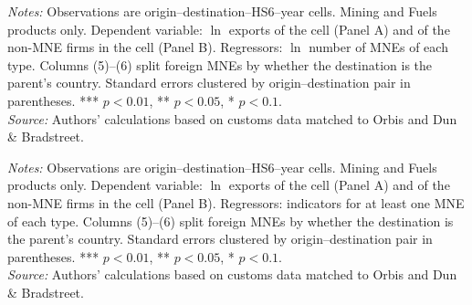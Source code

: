 \documentclass[11pt,a4paper]{article}
\begin{document}
\begin{table}[H]\centering\small%
  \caption{Mining and Fuels: Multinational Presence and Exports: Intensive Margin, by Type of Multinational}%
  \label{tab:cnt_mining}%
  \par\vspace{3pt}%
  \begin{minipage}{0.95\textwidth}\footnotesize %
  \textit{Notes:} Observations are origin--destination--HS6--year cells. Mining and Fuels products only. Dependent variable: $\ln$ exports of the cell (Panel A) and of the non-MNE firms in the cell (Panel B). Regressors: $\ln$ number of MNEs of each type. Columns (5)--(6) split foreign MNEs by whether the destination is the parent's country. Standard errors clustered by origin--destination pair in parentheses. *** $p<0.01$, ** $p<0.05$, * $p<0.1$.\\[3pt]%
  \textit{Source:} Authors' calculations based on customs data matched to Orbis and Dun \& Bradstreet.%
  \end{minipage}%
  \end{table}
\begin{table}[H]\centering\small%
  \caption{Mining and Fuels: Multinational Presence and Exports: Extensive Margin, by Type of Multinational}%
  \label{tab:ext_mining}%
  \par\vspace{3pt}%
  \begin{minipage}{0.95\textwidth}\footnotesize %
  \textit{Notes:} Observations are origin--destination--HS6--year cells. Mining and Fuels products only. Dependent variable: $\ln$ exports of the cell (Panel A) and of the non-MNE firms in the cell (Panel B). Regressors: indicators for at least one MNE of each type. Columns (5)--(6) split foreign MNEs by whether the destination is the parent's country. Standard errors clustered by origin--destination pair in parentheses. *** $p<0.01$, ** $p<0.05$, * $p<0.1$.\\[3pt]%
  \textit{Source:} Authors' calculations based on customs data matched to Orbis and Dun \& Bradstreet.%
  \end{minipage}%
  \end{table}
\end{document}
